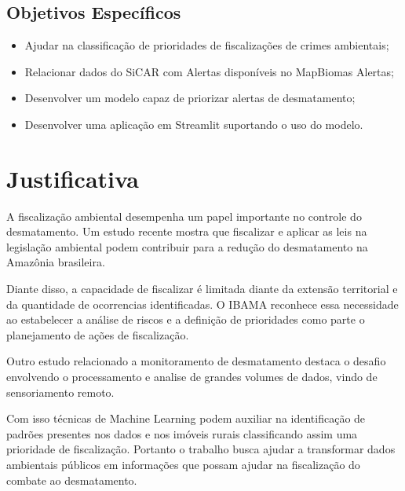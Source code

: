 \documentclass[12pt,a4paper]{article}
\begin{document}
\subsection{Objetivos Específicos}

\begin{itemize}
    \item Ajudar na classificação de prioridades de fiscalizações de crimes ambientais;
    \item Relacionar dados do SiCAR com Alertas disponíveis no MapBiomas Alertas;
    \item Desenvolver um modelo capaz de priorizar alertas de desmatamento;
    \item Desenvolver uma aplicação em Streamlit suportando o uso do modelo.
\end{itemize}

\section{Justificativa}

A fiscalização ambiental desempenha um papel importante no controle do desmatamento. Um estudo recente mostra que fiscalizar e aplicar as leis na legislação ambiental podem contribuir para a redução do desmatamento na Amazônia brasileira. \cite{amazoniabrasileira}

Diante disso, a capacidade de fiscalizar é limitada diante da extensão territorial e da quantidade de ocorrencias identificadas. O IBAMA reconhece essa necessidade ao estabelecer a análise de riscos e a definição de prioridades como parte o planejamento de ações de fiscalização. \cite{ibamalegislacao}

Outro estudo relacionado a monitoramento de desmatamento destaca o desafio envolvendo o processamento e analise de grandes volumes de dados, vindo de sensoriamento remoto. \cite{monitoramentdesmatamento}

Com isso técnicas de Machine Learning podem auxiliar na identificação de padrões presentes nos dados e nos imóveis rurais classificando assim uma prioridade de fiscalização. Portanto o trabalho busca ajudar a transformar dados ambientais públicos em informações que possam ajudar na fiscalização do combate ao desmatamento.
\end{document}
